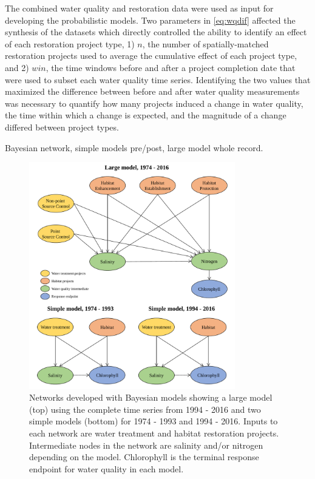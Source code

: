 \documentclass[]{article}
\begin{document}
The combined water quality and restoration data were used as input for
developing the probabilistic models. Two parameters in \cref{eq:wqdif}
affected the synthesis of the datasets which directly controlled the
ability to identify an effect of each restoration project type, 1)
\(n\), the number of spatially-matched restoration projects used to
average the cumulative effect of each project type, and 2) \(win\), the
time windows before and after a project completion date that were used
to subset each water quality time series. Identifying the two values
that maximized the difference between before and after water quality
measurements was necessary to quantify how many projects induced a
change in water quality, the time within which a change is expected, and
the magnitude of a change differed between project types.

Bayesian network, simple models pre/post, large model whole record.

\begin{figure}
\centerline{\includegraphics[width = 0.8\textwidth]{figs/flow_chrts.pdf}}
\caption{Networks developed with Bayesian models showing a large model (top) using the complete time series from 1994 - 2016 and two simple models (bottom) for 1974 - 1993 and 1994 - 2016. Inputs to each network are water treatment and habitat restoration projects.  Intermediate nodes in the network are salinity and/or nitrogen depending on the model.  Chlorophyll is the terminal response endpoint for water quality in each model.}
\label{fig:bys_flo}
\end{figure}
\end{document}
